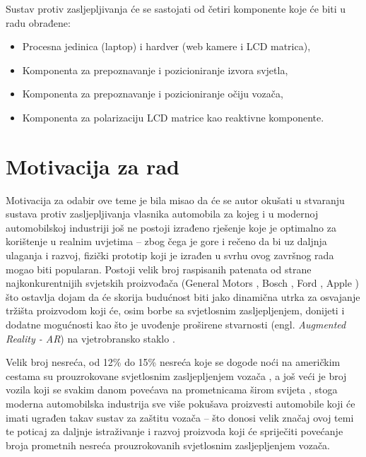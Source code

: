 \documentclass{foi}
\begin{document}
\begin{flushleft}Sustav protiv zasljepljivanja će se sastojati od četiri komponente koje će biti u radu obrađene:\end{flushleft}
\begin{itemize}[noitemsep]
    \item Procesna jedinica (laptop) i hardver (web kamere i LCD matrica),
    \item Komponenta za prepoznavanje i pozicioniranje izvora svjetla,
    \item Komponenta za prepoznavanje i pozicioniranje očiju vozača,
    \item Komponenta za polarizaciju LCD matrice kao reaktivne komponente.
\end{itemize}

\section{Motivacija za rad}

Motivacija za odabir ove teme je bila misao da će se autor okušati u stvaranju sustava protiv zasljepljivanja vlasnika automobila za kojeg i u modernoj automobilskoj industriji još ne postoji izrađeno rješenje koje je optimalno za korištenje u realnim uvjetima – zbog čega je gore i rečeno da bi uz daljnja ulaganja i razvoj,  fizički prototip koji je izrađen u svrhu ovog završnog rada mogao biti popularan. Postoji velik broj raspisanih patenata od strane najkonkurentnijih svjetskih proizvođača (General Motors \cite{Bogdan2023}, Bosch \cite{Chris}, Ford \cite{ElectronicSpecifier2016}, Apple \cite{OwenMal2018}) što ostavlja dojam da će skorija budućnost biti jako dinamična utrka za osvajanje tržišta proizvodom koji će, osim borbe sa svjetlosnim zasljepljenjem, donijeti i dodatne mogućnosti kao što je uvođenje proširene stvarnosti (engl. \emph{Augmented Reality - AR}) na vjetrobransko staklo \cite{Bogdan2023} \cite{Ungureanu2020}.

Velik broj nesreća, od 12\% do 15\% nesreća koje se dogode noći na američkim cestama su prouzrokovane svjetlosnim zasljepljenjem vozača \cite{Hu2022}, a još veći je broj vozila koji se svakim danom povećava na prometnicama širom svijeta \cite{LeasingOptions2021}, stoga moderna automobilska industrija sve više pokušava proizvesti automobile koji će imati ugrađen takav sustav za zaštitu vozača – što donosi velik značaj ovoj temi te poticaj za daljnje istraživanje i razvoj proizvoda koji će spriječiti povećanje broja prometnih nesreća prouzrokovanih svjetlosnim zasljepljenjem vozača.
\end{document}
